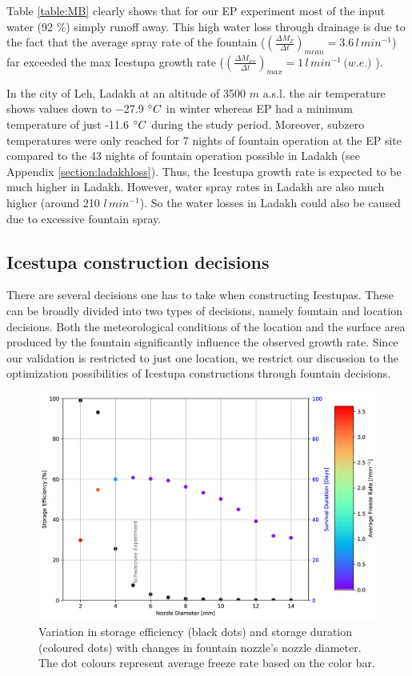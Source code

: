 \documentclass[utf8]{frontiersSCNS} %
\begin{document}
Table \ref{table:MB} clearly shows that for our EP experiment most of the input water (92 \%) simply runoff
away. This high water loss through drainage is due to the fact that the average spray rate of the fountain
($(\frac{\Delta M_{F}}{\Delta t})_{mean} = 3.6\, l\,min^{-1}$) far exceeded the max Icestupa growth rate
($(\frac{\Delta M_{ice}}{\Delta t})_{max} = 1\, l\,min^{-1}\, \textit{(w.e.)}$ ).

In the city of Leh, Ladakh at an altitude of 3500 $m$ a.s.l. the air temperature shows values down to −27.9 $\degree
C$ in winter \citep{Chevuturi_2018} whereas EP had a minimum temperature of just -11.6 $\degree C$ during the
study period. Moreover, subzero temperatures were only reached for 7 nights of fountain operation at the EP
site compared to the 43 nights of fountain operation possible in Ladakh (see Appendix \ref{section:ladakhloss}). Thus,
the Icestupa growth rate is expected to be much higher in Ladakh. However, water spray rates in Ladakh are also much
higher (around 210 $l\,min^{-1}$). So the water losses in Ladakh could also be caused due to excessive fountain spray.

\subsection{Icestupa construction decisions} There are several decisions one has to take when constructing Icestupas.
These can be broadly divided into two types of decisions, namely fountain and location decisions.  Both the
meteorological conditions of the location and the surface area produced by the fountain significantly influence the
observed growth rate. Since our validation is restricted to just one location, we restrict our discussion to the
optimization possibilities of Icestupa constructions through fountain decisions.

  \begin{figure} \begin{center} \includegraphics[width=15 cm]{Figures/Figure_10.jpg} \end{center} \caption{Variation
in storage efficiency (black dots) and storage duration (coloured dots) with changes in fountain nozzle's nozzle
diameter.  The dot colours represent average freeze rate based on the color bar.} \label{fig:dia_f} \end{figure}
  
\end{document}
